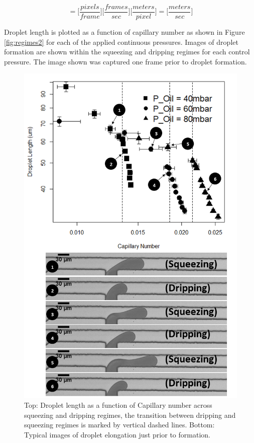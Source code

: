 \begin{equation}
[u] = \Big[\frac{pixels}{frame}\Big] \Big[\frac{frames}{sec}\Big] \Big[\frac{meters}{pixel}\Big] = \Big[\frac{meters}{sec}\Big]
\label{eq:velocity}
\end{equation}

Droplet length is plotted as a function of capillary number as shown in Figure \vref{fig:regimes2} for each of the applied continuous pressures. Images of droplet formation are shown within the squeezing and dripping regimes for each control pressure. The image shown was captured one frame prior to droplet formation. 

\begin{figure}
\centering 
\includegraphics[width=0.75\columnwidth]{regimes2.PNG} 
\caption[Droplet length as a function of Capillary number across squeezing and dripping regimes]{Top: Droplet length as a function of Capillary number across squeezing and dripping regimes, the transition between dripping and squeezing regimes is marked by vertical dashed lines. Bottom: Typical images of droplet elongation just prior to formation.} 
\label{fig:regimes2} 
\end{figure}

